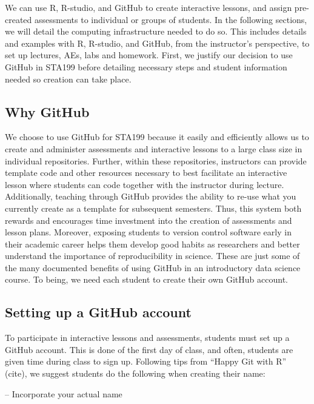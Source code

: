 \documentclass[
  12pt]{article}
\begin{document}
We can use R, R-studio, and GitHub to create interactive lessons, and
assign pre-created assessments to individual or groups of students. In
the following sections, we will detail the computing infrastructure
needed to do so. This includes details and examples with R, R-studio,
and GitHub, from the instructor's perspective, to set up lectures, AEs,
labs and homework. First, we justify our decision to use GitHub in
STA199 before detailing necessary steps and student information needed
so creation can take place.

\hypertarget{why-github}{%
\subsection{Why GitHub}\label{why-github}}

We choose to use GitHub for STA199 because it easily and efficiently
allows us to create and administer assessments and interactive lessons
to a large class size in individual repositories. Further, within these
repositories, instructors can provide template code and other resources
necessary to best facilitate an interactive lesson where students can
code together with the instructor during lecture. Additionally, teaching
through GitHub provides the ability to re-use what you currently create
as a template for subsequent semesters. Thus, this system both rewards
and encourages time investment into the creation of assessments and
lesson plans. Moreover, exposing students to version control software
early in their academic career helps them develop good habits as
researchers and better understand the importance of reproducibility in
science. These are just some of the many documented benefits of using
GitHub in an introductory data science course. To being, we need each
student to create their own GitHub account.

\hypertarget{setting-up-a-github-account}{%
\subsection{Setting up a GitHub
account}\label{setting-up-a-github-account}}

To participate in interactive lessons and assessments, students must set
up a GitHub account. This is done of the first day of class, and often,
students are given time during class to sign up. Following tips from
``Happy Git with R'' (cite), we suggest students do the following when
creating their name:

-- Incorporate your actual name
\end{document}
